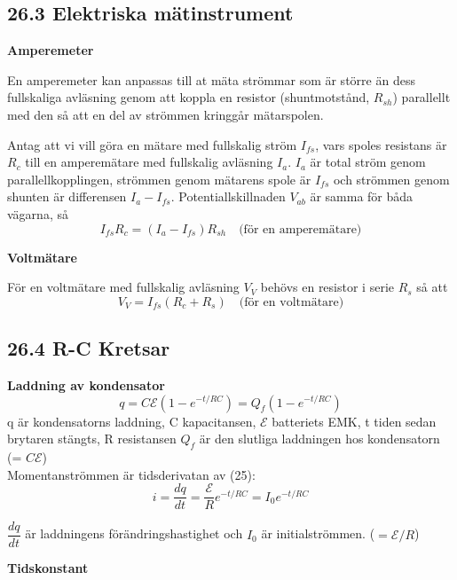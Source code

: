\documentclass[a4paper]{article}
\begin{document}
\subsection*{26.3 Elektriska mätinstrument}
\textbf{Amperemeter}

En amperemeter kan anpassas till at mäta strömmar som är större än dess fullskaliga avläsning genom att koppla en resistor
(shuntmotstånd, $R_{sh}$)
parallellt med den så att en del av strömmen kringgår mätarspolen.

Antag att vi vill göra en mätare med fullskalig ström $I_{fs}$, vars spoles resistans är $R_c$ till en amperemätare med fullskalig avläsning $I_a$. $I_a$ är total ström genom parallellkopplingen, strömmen genom mätarens spole är $I_{fs}$ och strömmen genom shunten är differensen $I_a - I_{fs}$. Potentiallskillnaden $V_{ab}$ är samma för båda vägarna, så
\begin{equation}
I_{fs}R_c = (I_a - I_{fs})R_{sh} \quad \text{(för en amperemätare)}
\end{equation}

\textbf{Voltmätare}

För en voltmätare med fullskalig avläsning $V_V$ behövs en resistor i serie $R_s$ så att
\begin{equation}
V_V = I_{fs}(R_c + R_s) \quad \text{(för en voltmätare)}
\end{equation}

\subsection*{26.4 R-C Kretsar}

\textbf{Laddning av kondensator}
\begin{equation}
q = C \mathcal{E}(1-e^{-t/RC}) = Q_f(1-e^{-t/RC})
\end{equation}
q är kondensatorns laddning, C kapacitansen, $\mathcal{E}$ batteriets EMK, t tiden sedan brytaren stängts, R resistansen $Q_f$ är den slutliga laddningen hos kondensatorn (= $C\mathcal{E}$)
\\

Momentanströmmen är tidsderivatan av (25):
\begin{equation}
i = \dfrac{dq}{dt} = \dfrac{\mathcal{E}}{R} e^{-t/RC} = I_0 e^{-t/RC}
\end{equation}

$\dfrac{dq}{dt}$ är laddningens förändringshastighet och $I_0$ är initialströmmen. ($=\mathcal{E}/R$)

\newpage
\textbf{Tidskonstant}
\end{document}

